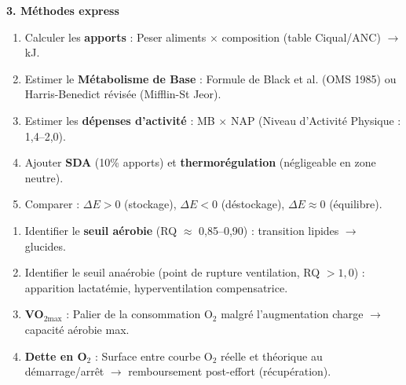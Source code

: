 \documentclass[11pt]{article}
\newcommand{\cle}[1]{{\popxbold\color{popdark}#1}}
\begin{document}
\begin{bilan}
\textbf{3. Méthodes express}
\begin{methode}
    \begin{enumerate}
        \item Calculer les \textbf{apports} : Peser aliments $\times$ composition (table Ciqual/ANC) $\rightarrow$ kJ.
        \item Estimer le \textbf{Métabolisme de Base} : Formule de Black et al. (OMS 1985) ou Harris-Benedict révisée (Mifflin-St Jeor).
        \item Estimer les \textbf{dépenses d'activité} : MB $\times$ NAP (Niveau d'Activité Physique : 1,4--2,0).
        \item Ajouter \textbf{SDA} (10\% apports) et \textbf{thermorégulation} (négligeable en zone neutre).
        \item Comparer : $\Delta E > 0$ (stockage), $\Delta E < 0$ (déstockage), $\Delta E \approx 0$ (équilibre).
    \end{enumerate}
\end{methode}

\begin{methode}
    \begin{enumerate}
        \item Identifier le \textbf{seuil aérobie} (RQ $\approx$ 0,85--0,90) : transition lipides $\rightarrow$ glucides.
        \item Identifier le \cle{seuil anaérobie} (point de rupture ventilation, RQ $> 1,0$) : apparition lactatémie, hyperventilation compensatrice.
        \item \textbf{VO$_{2\text{max}}$} : Palier de la consommation O$_2$ malgré l'augmentation charge $\rightarrow$ capacité aérobie max.
        \item \textbf{Dette en O$_2$} : Surface entre courbe O$_2$ réelle et théorique au démarrage/arrêt $\rightarrow$ remboursement post-effort (récupération).
    \end{enumerate}
\end{methode}


\end{bilan}
\end{document}
